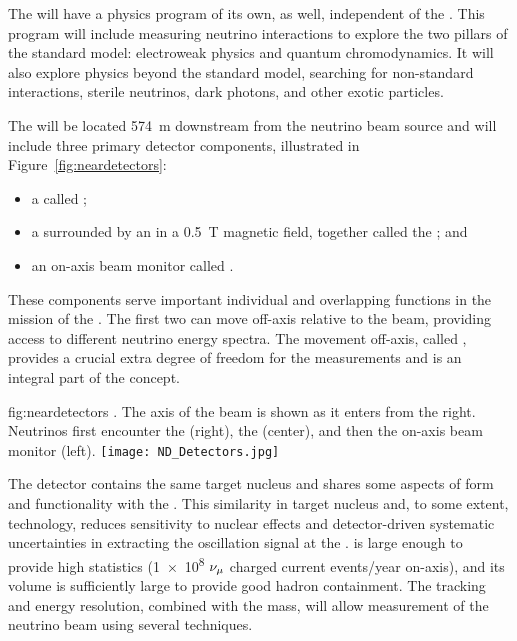 The  will have a physics program of its own, as well, independent of the .  This program will include measuring neutrino interactions to explore the two pillars of the standard model: electroweak physics and quantum chromodynamics. It will also explore physics beyond the standard model, searching for non-standard interactions, sterile neutrinos,  dark photons, and  other exotic particles.

The  will be located \SI{574}{m} downstream from the neutrino beam source and will include three primary detector components, illustrated in Figure~\ref{fig:neardetectors}: 

\begin{itemize}
\item a  called ; 
\item a  surrounded by an  in a \SI{0.5}{T} magnetic field, together called the ; and 
\item an on-axis beam monitor called .
\end{itemize}
These components serve important individual and overlapping functions in the mission of the .  The first two can move off-axis relative to the beam, providing access to different neutrino energy spectra. The movement off-axis, called , provides a crucial extra degree of freedom for the  measurements and is an integral part of the   concept. 

\begin{dunefigure}
{fig:neardetectors}
{ . The axis of the beam is shown as it enters from the right. Neutrinos first encounter
the  (right), the  (center), and then the on-axis beam monitor (left).}
\texttt{[image: ND\_Detectors.jpg]}
\end{dunefigure}

The  detector contains the same target nucleus and shares some aspects of form and functionality with the . 
This similarity in target nucleus and, to some extent, technology, reduces sensitivity to nuclear effects and detector-driven systematic uncertainties in extracting the oscillation signal at the  . %
 is large enough to provide high statistics (\num{1e8} $\nu_\mu$  charged current events/year on-axis), and its volume is sufficiently large to provide good hadron containment.  The tracking and energy resolution, combined with the  mass, will allow measurement of the neutrino beam using several techniques. %

